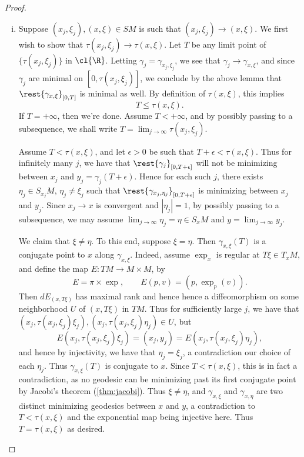 \begin{proof}
\begin{enumerate}[i.]
\item Suppose $(x_j,\xi_j),(x,\xi)\in SM$ is such that $(x_j,\xi_j)\to(x,\xi)$.  We first wish to show that $\tau(x_j,\xi_j)\to\tau(x,\xi)$.  Let $T$ be any limit point of $\{\tau(x_j,\xi_j)\}$ in $\cl{\R}$.  Letting $\gamma_j=\gamma_{x_j,\xi_j}$, we see that $\gamma_j\to\gamma_{x,\xi}$, and since $\gamma_j$ are minimal on $[0,\tau(x_j,\xi_j)]$, we conclude by the above lemma that $\rest{\gamma_{x,\xi}}_{[0,T]}$ is minimal as well.  By definition of $\tau(x,\xi)$, this implies
$$T\leq\tau(x,\xi).$$
If $T=+\infty$, then we're done.  Assume $T<+\infty$, and by possibly passing to a subsequence, we shall write $T=\lim_{j\to\infty}\tau(x_j,\xi_j).$

Assume $T<\tau(x,\xi)$, and let $\epsilon>0$ be such that $T+\epsilon<\tau(x,\xi)$.  Thus for infinitely many $j$, we have that $\rest{\gamma_j}_{[0,T+\epsilon]}$ will not be minimizing between $x_j$ and $y_j=\gamma_j(T+\epsilon)$.  Hence for each such $j$, there exists $\eta_j\in S_{x_j}M$, $\eta_j\neq\xi_j$ such that $\rest{\gamma_{x_j,\eta_j}}_{[0,T+\epsilon]}$ is minimizing between $x_j$ and $y_j$.  Since $x_j\to x$ is convergent and $|\eta_j|=1$, by possibly passing to a subsequence, we may assume $\lim_{j\to\infty}\eta_j=\eta\in S_xM$ and $y=\lim_{j\to\infty}y_j$.

We claim that $\xi\neq\eta$.  To this end, suppose $\xi=\eta$.  Then $\gamma_{x,\xi}(T)$ is a conjugate point to $x$ along $\gamma_{x,\xi}$.  Indeed, assume $\exp_x$ is regular at $T\xi\in T_xM$, and define the map $E:TM\to M\times M$, by
$$E=\pi\times\exp,\qquad E(p,v)=(p,\exp_p(v)).$$
Then $dE_{(x,T\xi)}$ has maximal rank and hence hence a diffeomorphism on some neighborhood $U$ of $(x,T\xi)$ in $TM$.  Thus for sufficiently large $j$, we have that $(x_j,\tau(x_j,\xi_j)\xi_j),(x_j,\tau(x_j,\xi_j)\eta_j)\in U$, but
$$E(x_j,\tau(x_j,\xi_j)\xi_j)=(x_j,y_j)=E(x_j,\tau(x_j,\xi_j)\eta_j),$$
and hence by injectivity, we have that $\eta_j=\xi_j$, a contradiction our choice of each $\eta_j$.  Thus $\gamma_{x,\xi}(T)$ is conjugate to $x$.  Since $T<\tau(x,\xi)$, this is in fact a contradiction, as no geodesic can be minimizing past its first conjugate point by Jacobi's theorem (\cref{thm:jacobi}).  Thus $\xi\neq\eta$, and $\gamma_{x,\xi}$ and $\gamma_{x,\eta}$ are two distinct minimizing geodesics between $x$ and $y$, a contradiction to $T<\tau(x,\xi)$ and the exponential map being injective here.  Thus $T=\tau(x,\xi)$ as desired.


\end{enumerate}
\end{proof}
